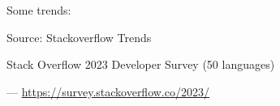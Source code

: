 \documentclass[
    xcolor={svgnames,dvipsnames},
    hyperref={colorlinks, citecolor=DeepPink4, linkcolor=DarkRed, urlcolor=DarkBlue}
    ]{beamer}  %
\newcommand{\1}{\mathbbm 1}
\begin{document}
\begin{frame}

    Some trends: 

    \begin{figure}
       \begin{center}
       \end{center}
    \end{figure}

    Source: Stackoverflow Trends

\end{frame}


\begin{frame}

    Stack Overflow 2023 Developer Survey (50 languages)


    \begin{figure}
       \begin{center}
       \end{center}
    \end{figure}
    

    \hspace*{\fill}--- \url{https://survey.stackoverflow.co/2023/}


\end{frame}
\end{document}
